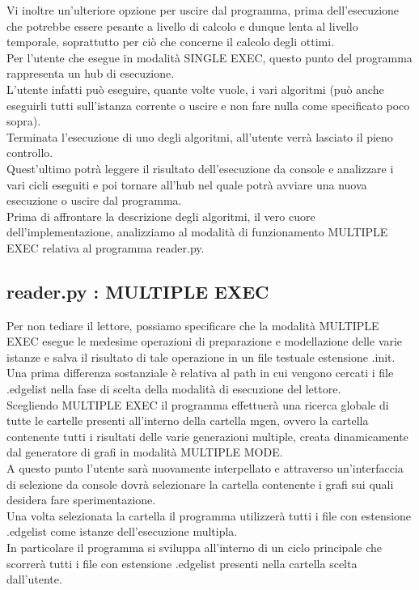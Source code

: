 Vi inoltre un'ulteriore opzione per uscire dal programma, prima dell'esecuzione che potrebbe essere pesante a livello di calcolo e dunque lenta al livello temporale, soprattutto per ciò che concerne il calcolo degli ottimi.\\

Per l'utente che esegue in modalità SINGLE EXEC, questo punto del programma rappresenta un hub di esecuzione.\\
L'utente infatti può eseguire, quante volte vuole, i vari algoritmi (può anche eseguirli tutti sull'istanza corrente o uscire e non fare nulla come specificato poco sopra).\\
Terminata l'esecuzione di uno degli algoritmi, all'utente verrà lasciato il pieno controllo.\\
Quest'ultimo potrà leggere il risultato dell'esecuzione da console e analizzare i vari cicli eseguiti e poi tornare all'hub nel quale potrà avviare una nuova esecuzione o uscire dal programma.\\

Prima di affrontare la descrizione degli algoritmi, il vero cuore dell'implementazione, analizziamo al modalità di funzionamento MULTIPLE EXEC relativa al programma reader.py.\\

\subsection{reader.py : MULTIPLE EXEC}
\justify
Per non tediare il lettore, possiamo specificare che la modalità MULTIPLE EXEC esegue le medesime operazioni di preparazione e modellazione delle varie istanze e salva il risultato di tale operazione in un file testuale estensione .init.\\

Una prima differenza sostanziale è relativa al path in cui vengono cercati i file .edgelist nella fase di scelta della modalità di esecuzione del lettore.\\
Scegliendo MULTIPLE EXEC il programma effettuerà una ricerca globale di tutte le cartelle presenti all'interno della cartella mgen, ovvero la cartella contenente tutti i risultati delle varie generazioni multiple, creata dinamicamente dal generatore di grafi in modalità MULTIPLE MODE.\\

A questo punto l'utente sarà nuovamente interpellato e attraverso un'interfaccia di selezione da console dovrà selezionare la cartella contenente i grafi sui quali desidera fare sperimentazione.\\
Una volta selezionata la cartella il programma utilizzerà tutti i file con estensione .edgelist come istanze dell'esecuzione multipla.\\
In particolare il programma si sviluppa all'interno di un ciclo principale che scorrerà tutti i file con estensione .edgelist presenti nella cartella scelta dall'utente.\\

